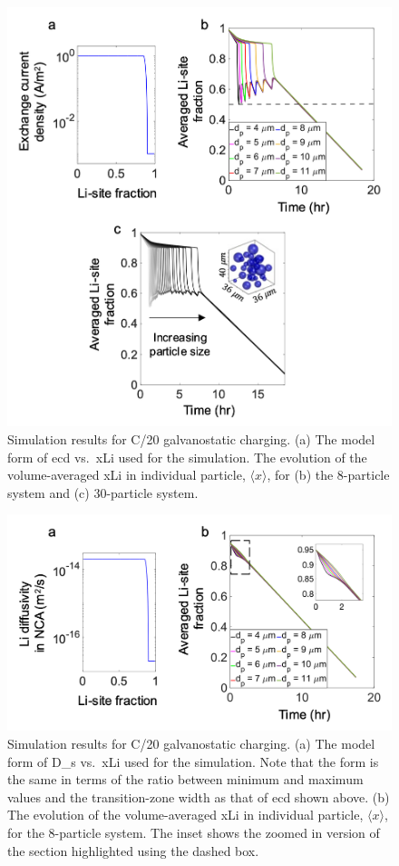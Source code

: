 \documentclass{article}
\begin{document}
\newpage
\begin{figure}[!h]
  \includegraphics[scale =0.7]{figures/modeling_figure_1.png}
  \caption{Simulation results for C/20 galvanostatic charging. (a)
    The model form of \gls{ecd} vs.\ \gls{xLi} used for the
    simulation. The evolution of the volume-averaged \gls{xLi} in
    individual particle, $\langle x \rangle$, for (b) the 8-particle
    system and (c) 30-particle system.}
  \label{fig:model-1}
\end{figure}

\newpage
\begin{figure}[!h]
  \includegraphics[scale =0.7]{figures/modeling_figure_2.png}
  \caption{Simulation results for C/20 galvanostatic charging. (a)
    The model form of \gls{D_s} vs.\ \gls{xLi} used for the
    simulation. Note that the form is the same in terms of the ratio
    between minimum and maximum values and the transition-zone width
    as that of \gls{ecd} shown above. (b) The evolution of the
    volume-averaged \gls{xLi} in individual particle, $\langle x
    \rangle$, for the 8-particle system. The inset shows the zoomed
    in version of the section highlighted using the dashed box.}
  \label{fig:model-2}
\end{figure}


\newpage


\end{document}
